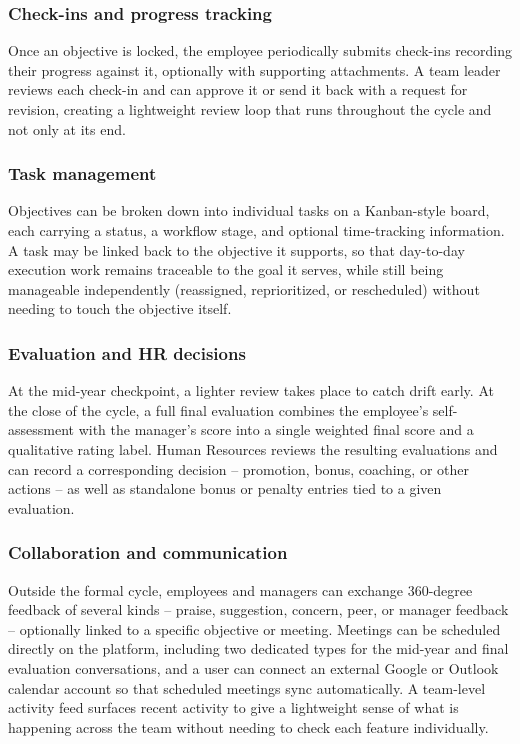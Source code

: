 \documentclass[12pt,a4paper]{report}
\begin{document}
\subsubsection{Check-ins and progress tracking}

Once an objective is locked, the employee periodically submits check-ins recording their progress against it, optionally with supporting attachments. A team leader reviews each check-in and can approve it or send it back with a request for revision, creating a lightweight review loop that runs throughout the cycle and not only at its end.

\subsubsection{Task management}

Objectives can be broken down into individual tasks on a Kanban-style board, each carrying a status, a workflow stage, and optional time-tracking information. A task may be linked back to the objective it supports, so that day-to-day execution work remains traceable to the goal it serves, while still being manageable independently (reassigned, reprioritized, or rescheduled) without needing to touch the objective itself.

\subsubsection{Evaluation and HR decisions}

At the mid-year checkpoint, a lighter review takes place to catch drift early. At the close of the cycle, a full final evaluation combines the employee's self-assessment with the manager's score into a single weighted final score and a qualitative rating label. Human Resources reviews the resulting evaluations and can record a corresponding decision -- promotion, bonus, coaching, or other actions -- as well as standalone bonus or penalty entries tied to a given evaluation.

\subsubsection{Collaboration and communication}

Outside the formal cycle, employees and managers can exchange 360-degree feedback of several kinds -- praise, suggestion, concern, peer, or manager feedback -- optionally linked to a specific objective or meeting. Meetings can be scheduled directly on the platform, including two dedicated types for the mid-year and final evaluation conversations, and a user can connect an external Google or Outlook calendar account so that scheduled meetings sync automatically. A team-level activity feed surfaces recent activity to give a lightweight sense of what is happening across the team without needing to check each feature individually.
\end{document}
